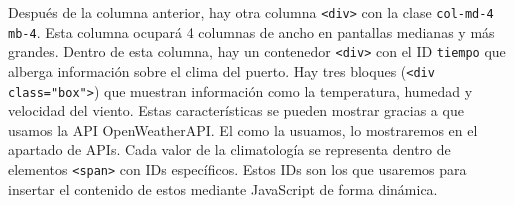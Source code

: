 \documentclass{article}
\begin{document}
\noindent Después de la columna anterior, hay otra columna \texttt{<div>} con la clase \texttt{col-md-4 mb-4}. Esta columna ocupará 4 columnas de ancho en pantallas medianas y más grandes. Dentro de esta columna, hay un contenedor \texttt{<div>} con el ID \texttt{tiempo} que alberga información sobre el clima del puerto. Hay tres bloques (\texttt{<div class="box">}) que muestran información como la temperatura, humedad y velocidad del viento. Estas características se pueden mostrar gracias a que usamos la API OpenWeatherAPI. El como la usuamos, lo mostraremos en el apartado de APIs. Cada valor de la climatología se representa dentro de elementos \texttt{<span>} con IDs específicos. Estos IDs son los que usaremos para insertar el contenido de estos mediante JavaScript de forma dinámica.\\
\end{document}
